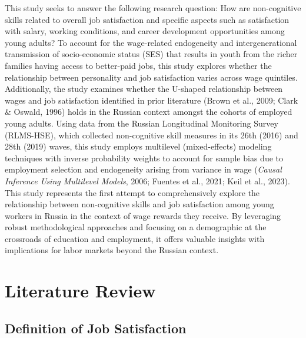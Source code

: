\documentclass[
]{interact}
\begin{document}
This study seeks to answer the following research question: How are
non-cognitive skills related to overall job satisfaction and specific
aspects such as satisfaction with salary, working conditions, and career
development opportunities among young adults? To account for the
wage-related endogeneity and intergenerational transmission of
socio-economic status (SES) that results in youth from the richer
families having access to better-paid jobs, this study explores whether
the relationship between personality and job satisfaction varies across
wage quintiles. Additionally, the study examines whether the U-shaped
relationship between wages and job satisfaction identified in prior
literature (Brown et al., 2009; Clark \& Oswald, 1996) holds in the
Russian context amongst the cohorts of employed young adults. Using data
from the Russian Longitudinal Monitoring Survey (RLMS-HSE), which
collected non-cognitive skill measures in its 26th (2016) and 28th
(2019) waves, this study employs multilevel (mixed-effects) modeling
techniques with inverse probability weights to account for sample bias
due to employment selection and endogeneity arising from variance in
wage (\emph{Causal Inference Using Multilevel Models}, 2006; Fuentes et
al., 2021; Keil et al., 2023). This study represents the first attempt
to comprehensively explore the relationship between non-cognitive skills
and job satisfaction among young workers in Russia in the context of
wage rewards they receive. By leveraging robust methodological
approaches and focusing on a demographic at the crossroads of education
and employment, it offers valuable insights with implications for labor
markets beyond the Russian context.

\section{Literature Review}\label{literature-review}

\subsection{Definition of Job
Satisfaction}\label{definition-of-job-satisfaction}
\end{document}
